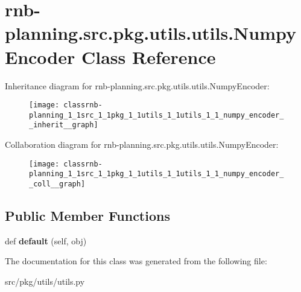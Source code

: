 \hypertarget{classrnb-planning_1_1src_1_1pkg_1_1utils_1_1utils_1_1_numpy_encoder}{}\section{rnb-\/planning.src.\+pkg.\+utils.\+utils.\+Numpy\+Encoder Class Reference}
\label{classrnb-planning_1_1src_1_1pkg_1_1utils_1_1utils_1_1_numpy_encoder}


Inheritance diagram for rnb-\/planning.src.\+pkg.\+utils.\+utils.\+Numpy\+Encoder\+:\nopagebreak
\begin{figure}[H]
\begin{center}
\leavevmode
\texttt{[image: classrnb-planning\_1\_1src\_1\_1pkg\_1\_1utils\_1\_1utils\_1\_1\_numpy\_encoder\_\_inherit\_\_graph]}
\end{center}
\end{figure}


Collaboration diagram for rnb-\/planning.src.\+pkg.\+utils.\+utils.\+Numpy\+Encoder\+:\nopagebreak
\begin{figure}[H]
\begin{center}
\leavevmode
\texttt{[image: classrnb-planning\_1\_1src\_1\_1pkg\_1\_1utils\_1\_1utils\_1\_1\_numpy\_encoder\_\_coll\_\_graph]}
\end{center}
\end{figure}
\subsection*{Public Member Functions}
\begin{DoxyCompactItemize}
\item 
\mbox{\label{classrnb-planning_1_1src_1_1pkg_1_1utils_1_1utils_1_1_numpy_encoder_a356086ad2d0e5d2249196f3b5e391722}} 
def {\bfseries default} (self, obj)
\end{DoxyCompactItemize}


The documentation for this class was generated from the following file\+:\begin{DoxyCompactItemize}
\item 
src/pkg/utils/utils.\+py\end{DoxyCompactItemize}
